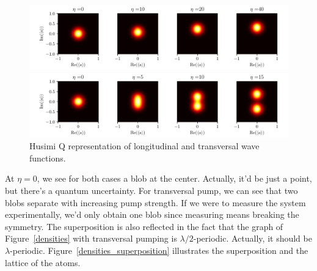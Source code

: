 \begin{figure}[!htb]
	\begin{minipage}[b]{1\linewidth}
	\centering
	\includegraphics[width=1\textwidth]{images/qfunc_long.pdf}
	\end{minipage}
%
	\begin{minipage}[b]{1\linewidth}
	\centering
	\includegraphics[width=1\textwidth]{images/qfunc_trans.pdf}
	\end{minipage}
\caption{Husimi Q representation of longitudinal and transversal wave functions.}
\label{qfunc}
\end{figure}
\FloatBarrier

\noindent At $\eta = 0$, we see for both cases a blob at the center. Actually, it'd be just a point, but there's a quantum uncertainty. For transversal pump, we can see that two blobs separate with increasing pump strength. If we were to measure the system experimentally, we'd only obtain one blob since measuring means breaking the symmetry. The superposition is also reflected in the fact that the graph of Figure~\ref{densities} with transversal pumping is $\lambda / 2$-periodic. Actually, it should be $\lambda$-periodic. Figure~\ref{densities_superposition} illustrates the superposition and the lattice of the atoms.

